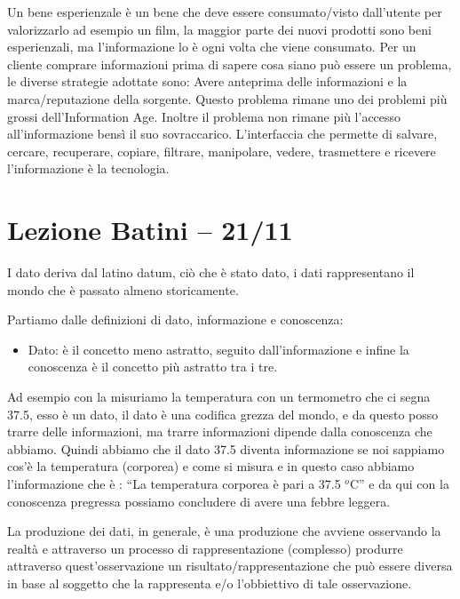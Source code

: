 \documentclass[a4page, 11pt]{article}
\begin{document}
Un bene esperienzale è un bene che deve essere consumato/visto
dall'utente per valorizzarlo ad esempio un film, la maggior parte dei
nuovi prodotti sono beni esperienzali, ma l'informazione lo è ogni volta
che viene consumato. Per un cliente comprare informazioni prima di
sapere cosa siano può essere un problema, le diverse strategie adottate
sono: Avere anteprima delle informazioni e la marca/reputazione della
sorgente. Questo problema rimane uno dei problemi più grossi
dell'Information Age. Inoltre il problema non rimane più l'accesso
all'informazione bensì il suo sovraccarico. L'interfaccia che permette
di salvare, cercare, recuperare, copiare, filtrare, manipolare, vedere,
trasmettere e ricevere l'informazione è la tecnologia.

\section*{Lezione Batini -- 21/11}

I dato deriva dal latino datum, ciò che è stato dato, i dati
rappresentano il mondo che è passato almeno storicamente.

Partiamo dalle definizioni di dato, informazione e conoscenza:

\begin{itemize}
	 
	\item
	Dato: è il concetto meno astratto, seguito dall'informazione e infine
	la conoscenza è il concetto più astratto tra i tre. 
\end{itemize}

Ad esempio con la misuriamo la temperatura con un termometro che ci
segna 37.5, esso è un dato, il dato è una codifica grezza del mondo, e
da questo posso trarre delle informazioni, ma trarre informazioni
dipende dalla conoscenza che abbiamo. Quindi abbiamo che il dato 37.5
diventa informazione se noi sappiamo cos'è la temperatura (corporea) e
come si misura e in questo caso abbiamo l'informazione che è : ``La
temperatura corporea è pari a 37.5 $^o$C'' e da qui con la conoscenza
pregressa possiamo concludere di avere una febbre leggera.

La produzione dei dati, in generale, è una produzione che avviene
osservando la realtà e attraverso un processo di rappresentazione
(complesso) produrre attraverso quest'osservazione un
risultato/rappresentazione che può essere diversa in base al soggetto
che la rappresenta e/o l'obbiettivo di tale osservazione.
\end{document}
